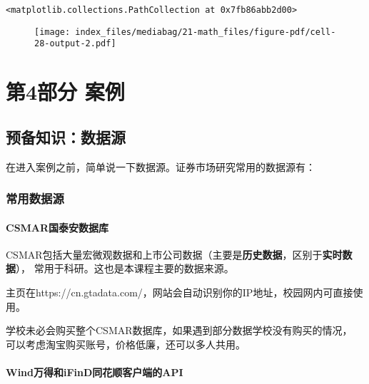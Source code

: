 \documentclass[
  letterpaper,
  DIV=11,
  numbers=noendperiod]{scrreprt}
\begin{document}
\begin{verbatim}
<matplotlib.collections.PathCollection at 0x7fb86abb2d00>
\end{verbatim}

\begin{figure}[H]

{\centering \texttt{[image: index\_files/mediabag/21-math\_files/figure-pdf/cell-28-output-2.pdf]}

}

\end{figure}

\part{第4部分 案例}

\hypertarget{ux9884ux5907ux77e5ux8bc6ux6570ux636eux6e90}{%
\chapter{预备知识：数据源}\label{ux9884ux5907ux77e5ux8bc6ux6570ux636eux6e90}}

在进入案例之前，简单说一下数据源。证券市场研究常用的数据源有：

\hypertarget{ux5e38ux7528ux6570ux636eux6e90}{%
\section{常用数据源}\label{ux5e38ux7528ux6570ux636eux6e90}}

\hypertarget{csmarux56fdux6cf0ux5b89ux6570ux636eux5e93}{%
\subsection{CSMAR国泰安数据库}\label{csmarux56fdux6cf0ux5b89ux6570ux636eux5e93}}

CSMAR包括大量宏微观数据和上市公司数据（主要是\textbf{历史数据}，区别于\textbf{实时数据}），
常用于科研。这也是本课程主要的数据来源。

主页在https://cn.gtadata.com/，网站会自动识别你的IP地址，校园网内可直接使用。

学校未必会购买整个CSMAR数据库，如果遇到部分数据学校没有购买的情况，
可以考虑淘宝购买账号，价格低廉，还可以多人共用。

\hypertarget{windux4e07ux5f97ux548cifindux540cux82b1ux987aux5ba2ux6237ux7aefux7684api}{%
\subsection{Wind万得和iFinD同花顺客户端的API}\label{windux4e07ux5f97ux548cifindux540cux82b1ux987aux5ba2ux6237ux7aefux7684api}}
\end{document}
